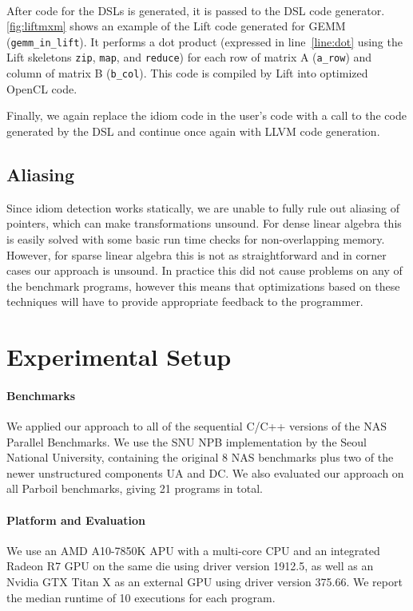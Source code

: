 \paragraph{}
After code for the DSLs is generated, it is passed to the DSL code generator.
\autoref{fig:liftmxm} shows an example of the Lift code generated for GEMM (\texttt{gemm\_in\_lift}).
It performs a dot product (expressed in line~\autoref{line:dot} using the Lift skeletons \texttt{zip}, \texttt{map}, and \texttt{reduce}) for each row of matrix A (\texttt{a\_row}) and column of matrix B (\texttt{b\_col}).
This code is compiled by Lift into optimized OpenCL code.

Finally, we again replace the idiom code in the user's code with a call to the code generated by the DSL and continue once again with LLVM code generation.

\subsection{Aliasing}

    Since idiom detection works statically, we are unable to fully rule out
    aliasing of pointers, which can make transformations unsound.
    For dense linear algebra this is easily solved with some basic run time
    checks for non-overlapping memory.
    However, for sparse linear algebra this is not as straightforward and in
    corner cases our approach is unsound.
    In practice this did not cause problems on any of the benchmark programs,
    however this means that optimizations based on these techniques will have to
    provide appropriate feedback to the programmer.

\section{Experimental Setup}

    \paragraph{Benchmarks}
    We applied our approach to all of the sequential C/C++ versions of the NAS
    Parallel Benchmarks.
    We use the SNU NPB implementation by the Seoul National University,
    containing the original 8 NAS benchmarks plus two of the newer unstructured
    components UA and DC.
    We also evaluated our approach on all Parboil benchmarks, giving 21 programs
    in total. 

    \paragraph{Platform and Evaluation}
    We use an AMD A10-7850K APU with a multi-core CPU and an integrated Radeon
    R7 GPU on the same die using driver version 1912.5, as well as an Nvidia GTX
    Titan X as an external GPU using driver version 375.66.
    We report the median runtime of 10 executions for each program.

